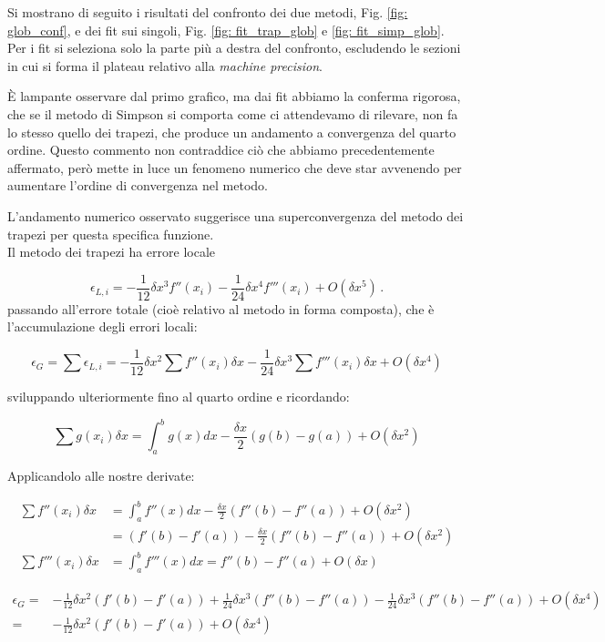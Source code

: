 Si mostrano di seguito i risultati del confronto dei due metodi, Fig. \ref{fig: glob_conf}, e dei fit sui singoli, Fig. \ref{fig: fit_trap_glob} e \ref{fig: fit_simp_glob}. Per i fit si seleziona solo la parte più a destra del confronto, escludendo le sezioni in cui si forma il plateau relativo alla \textit{machine precision}.

\noindent È lampante osservare dal primo grafico, ma dai fit abbiamo la conferma rigorosa, che se il metodo di Simpson si comporta come ci attendevamo di rilevare, non fa lo stesso quello dei trapezi, che produce un andamento a convergenza del quarto ordine. Questo commento non contraddice ciò che abbiamo precedentemente affermato, però mette in luce un fenomeno numerico che deve star avvenendo per aumentare l'ordine di convergenza nel metodo.

\medskip\noindent
L'andamento numerico osservato suggerisce una superconvergenza del metodo dei trapezi per questa specifica funzione.\\
Il metodo dei trapezi ha errore locale 

\begin{equation*}
    \epsilon_{L, i} = -\frac{1}{12} \delta x^3 f''(x_i) -\frac{1}{24} \delta x^4 f'''(x_i) + O(\delta x^5) \,.
\end{equation*}
passando all'errore totale (cioè relativo al metodo in forma composta), che è l'accumulazione degli errori locali:

$$\epsilon_G = \sum \epsilon_{L,i} = -\frac{1}{12}\delta x^2 \sum f''(x_i)\delta x - \frac{1}{24}\delta x^3 \sum f'''(x_i)\delta x + O(\delta x^4)$$

sviluppando ulteriormente fino al quarto ordine e ricordando:

$$\sum g(x_i)\delta x = \int_a^b g(x)dx - \frac{\delta x}{2} (g(b) - g(a)) + O(\delta x^2)$$

Applicandolo alle nostre derivate:

\begin{align*}
    \sum f''(x_i)\delta x &= \int_a^b f''(x)dx - \frac{\delta x}{2} \left( f'' (b)-f'' (a) \right)  + O(\delta x^2)  \\
    &= (f'(b) - f'(a)) - \frac{\delta x}{2} \left( f'' (b)-f'' (a) \right)  + O(\delta x^2)\\
    \sum f'''(x_i) \delta x &= \int_a^b f'''(x)dx = f''(b) - f''(a) + O(\delta x)
\end{align*}

\begin{align*}
    \epsilon_G =& -\frac{1}{12}\delta x^2 (f'(b) - f'(a)) + \frac{1}{24}\delta x^3 (f''(b) - f''(a)) - \frac{1}{24}\delta x^3 (f''(b) - f''(a)) + O(\delta x^4)\\
    =& -\frac{1}{12}\delta x^2 (f'(b) - f'(a))   + O(\delta x^4)
\end{align*}

